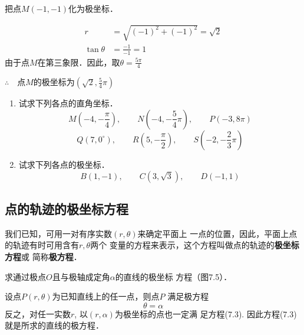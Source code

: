 \begin{example}
    把点$M(-1,-1)$化为极坐标．
\end{example}

\begin{solution}
\[\begin{split}
    r&=\sqrt{(-1)^2+(-1)^2}=\sqrt{2}\\
    \tan\theta&=\frac{-1}{-1}=1
\end{split}\]
由于点$M$在第三象限．因此，取$\theta=\frac{5\pi}{4}$

$\therefore\quad $点$M$的极坐标为$\left(\sqrt{2},\frac{5}{4}\pi\right)$
\end{solution}

\begin{ex}
\begin{enumerate}
    \item 试求下列各点的直角坐标．
\[M\left(-4,-\frac{\pi}{4}\right),\qquad N\left(-4,-\frac{5}{4}\pi\right),\qquad P(-3,8\pi)\]
\[Q(7,0^{\circ}),\qquad R\left(5,-\frac{\pi}{2}\right),\qquad S\left(-2,-\frac{2}{3}\pi\right)\]
    \item 试求下列各点的极坐标．
\[B(1,-1),\qquad C\left(3,\sqrt{3}\right),\qquad D(-1,1)\]
\end{enumerate}
\end{ex}

\subsection{点的轨迹的极坐标方程}
我们已知，可用一对有序实数$(r,\theta)$来确定平面上
一点的位置，因此，平面上点的轨迹有时可用含有$r,\theta$两个
变量的方程来表示，这个方程叫做点的轨迹的\textbf{极坐标方程}或
简称\textbf{极方程}．


\begin{example}
    求通过极点$O$且与极轴成定角$\alpha$的直线的极坐标
    方程（图7.5）．
\end{example}

\begin{solution}
    设点$P(r,\theta)$为已知直线上的任一点，则点$P$
    满足极方程
 \begin{equation}
     \theta=\alpha
 \end{equation}
    反之，对任一实数$r$, 以$(r,\alpha)$为极坐标的点也一定满
    足方程(7.3). 因此方程(7.3)就是所求的直线的极方程．
\end{solution}

